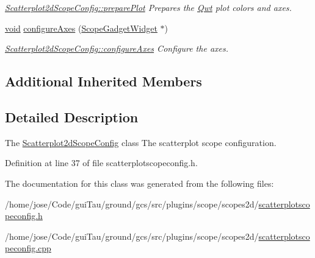 \begin{DoxyCompactItemize}
\begin{DoxyCompactList}\small\item\em \hyperlink{group___scope_plugin_ga7ff8815549e33c472a7ada6080401b38}{Scatterplot2d\-Scope\-Config\-::prepare\-Plot} Prepares the \hyperlink{namespace_qwt}{Qwt} plot colors and axes. \end{DoxyCompactList}\item 
\hyperlink{group___u_a_v_objects_plugin_ga444cf2ff3f0ecbe028adce838d373f5c}{void} \hyperlink{group___scope_plugin_ga420168b2c6740e98666d76cf58bfb2ee}{configure\-Axes} (\hyperlink{class_scope_gadget_widget}{Scope\-Gadget\-Widget} $\ast$)
\begin{DoxyCompactList}\small\item\em \hyperlink{group___scope_plugin_ga420168b2c6740e98666d76cf58bfb2ee}{Scatterplot2d\-Scope\-Config\-::configure\-Axes} Configure the axes. \end{DoxyCompactList}\end{DoxyCompactItemize}
\subsection*{Additional Inherited Members}


\subsection{Detailed Description}
The \hyperlink{class_scatterplot2d_scope_config}{Scatterplot2d\-Scope\-Config} class The scatterplot scope configuration. 

Definition at line 37 of file scatterplotscopeconfig.\-h.



The documentation for this class was generated from the following files\-:\begin{DoxyCompactItemize}
\item 
/home/jose/\-Code/gui\-Tau/ground/gcs/src/plugins/scope/scopes2d/\hyperlink{scatterplotscopeconfig_8h}{scatterplotscopeconfig.\-h}\item 
/home/jose/\-Code/gui\-Tau/ground/gcs/src/plugins/scope/scopes2d/\hyperlink{scatterplotscopeconfig_8cpp}{scatterplotscopeconfig.\-cpp}\end{DoxyCompactItemize}
